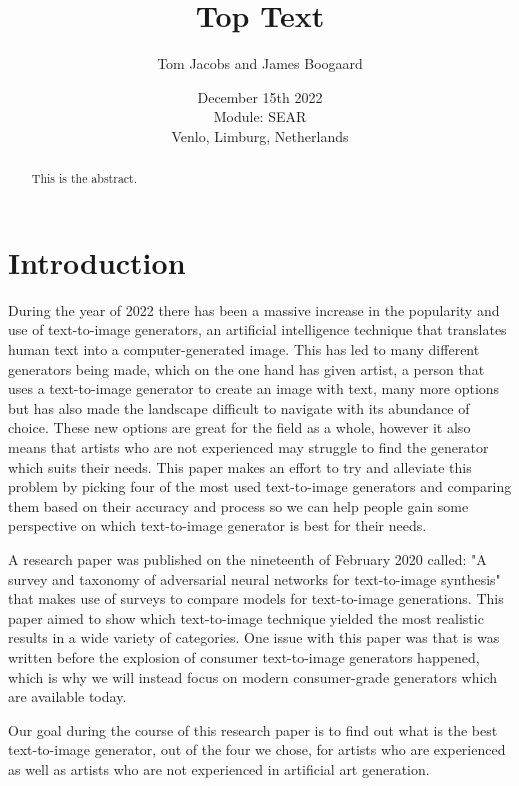 \documentclass[]{report}
\title{Top Text}
\author{Tom Jacobs and James Boogaard}
\date{December 15th 2022 \\Module: SEAR \\Venlo, Limburg, Netherlands}
\begin{document}
	
	\maketitle
	
	\begin{abstract}
		This is the abstract.
		
		
	\end{abstract}
	
	\tableofcontents
	\setcounter{page}{3}
	\listoffigures %
	\pagebreak
	
	
	\section{Introduction}
During the year of 2022 there has been a massive increase in the popularity and use of text-to-image generators, an artificial intelligence technique that translates human text into a computer-generated image. This has led to many different generators being made, which on the one hand has given artist, a person that uses a text-to-image generator to create an image with text, many more options but has also made the landscape difficult to navigate with its abundance of choice. These new options are great for the field as a whole, however it also means that artists who are not experienced may struggle to find the generator which suits their needs. This paper makes an effort to try and alleviate this problem by picking four of the most used text-to-image generators and comparing them based on their accuracy and process so we can help people gain some perspective on which text-to-image generator is best for their needs.

A research paper was published on the nineteenth of February 2020 called: "A survey and taxonomy of adversarial neural networks for text-to-image synthesis" that makes use of surveys to compare models for text-to-image generations. This paper aimed to show which text-to-image technique yielded the most realistic results in a wide variety of categories. One issue with this paper was that is was written before the explosion of consumer text-to-image generators happened, which is why we will instead focus on modern consumer-grade generators which are available today.

Our goal during the course of this research paper is to find out what is the best text-to-image generator, out of the four we chose, for artists who are experienced as well as artists who are not experienced in artificial art generation.
\end{document}
